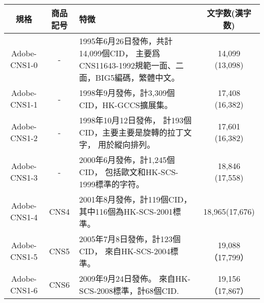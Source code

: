 \documentclass[a4,11pt,uplatex,openleft]{jsarticle}
\begin{document}
\begin{appendix}
\begin{table}[h]
\begin{tabular}{|c|c|p{7cm}|c|}
規格 & 商品記号	& 特徴	 & 文字数(漢字数) \\

\hline  %
Adobe-CNS1-0 &	-	 & 1995年6月26日發佈，共計14,099個CID，
主要爲CNS11643-1992規範一面、二面，BIG5編碼，繁體中文。
& 14,099 (13,098) \\
\hline
Adobe-CNS1-1	& - &	1998年9月發佈，計3,309個CID，HK-GCCS擴展集。
& 	17,408 (16,382) \\
\hline
Adobe-CNS1-2	& - &  1998年10月12日發佈，
計193個CID，主要主要是旋轉的拉丁文字，
用於縱向排列。 & 17,601 (16,382) \\
\hline

Adobe-CNS1-3	& -	&   2000年6月發佈，計1,245個CID，
包括歐文和HK-SCS-1999標準的字符。
&  18,846 (17,558) \\

\hline
Adobe-CNS1-4	& CNS4 & 2001年8月發佈，計119個CID，
其中116個為HK-SCS-2001標準。
& 18,965(17,676) \\
\hline
Adobe-CNS1-5	& CNS5 & 2005年7月8日發佈，計123個CID，
來自HK-SCS-2004標準。 & 19,088（17,799） \\
\hline
Adobe-CNS1-6	& CNS6 & 2009年9月24日發佈。
來自HK-SCS-2008標準，計68個CID. & 19,156（17,867） \\
\hline %
\end{tabular}

\end{table}


\end{appendix}
\end{document}
